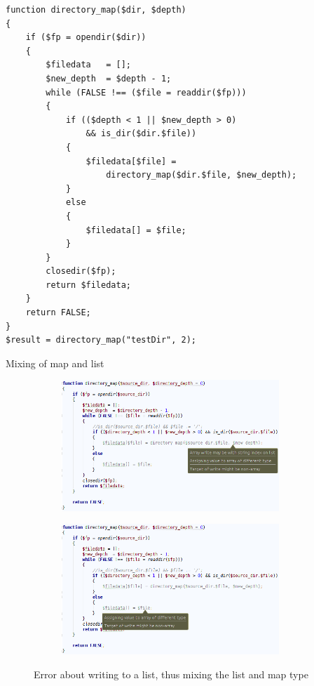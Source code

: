 \begin{program}
\begin{lstlisting}
function directory_map($dir, $depth)
{
    if ($fp = opendir($dir))
    {
        $filedata	= [];
        $new_depth	= $depth - 1;
        while (FALSE !== ($file = readdir($fp)))
        {
            if (($depth < 1 || $new_depth > 0) 
                && is_dir($dir.$file))
            {
                $filedata[$file] = 
                	directory_map($dir.$file, $new_depth);
            }
            else
            {
                $filedata[] = $file;
            }
        }
        closedir($fp);
        return $filedata;
    }
    return FALSE;
}
$result = directory_map("testDir", 2);
\end{lstlisting}
\caption{Mixing of map and list}
\label{lst:directoryMap}
\end{program}


\begin{figure}
\centering
\begin{subfigure}{\textwidth}
\centering
\includegraphics[width=0.9\textwidth]{chapters/caseStudy/newScreens/dirmap1}
\end{subfigure}
\begin{subfigure}{\textwidth}
\centering
\includegraphics[width=0.9\textwidth]{chapters/caseStudy/newScreens/dirmap2}
\end{subfigure}
\caption{Error about writing to a list, thus mixing the list and map type}
\label{fig:directoryScreenshot}
\end{figure}

